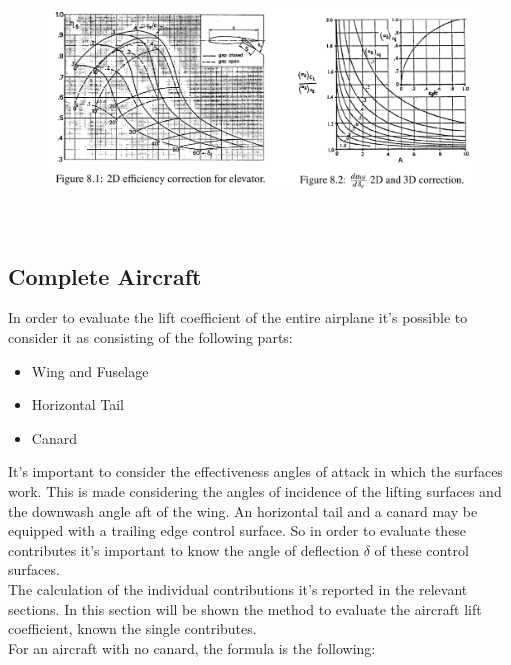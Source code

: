 \begin{figure}[H]
\centering
{\includegraphics[height=6.79cm]{Immagini/alfadeltanew.png}} 
\label{efficiency}
\end{figure} 		


		




\subsection{Complete Aircraft}

In order to evaluate the lift coefficient of the entire airplane it's possible to consider it as consisting of the following parts\cite{ roskam2002airplane}:

\begin{itemize}
\item Wing and Fuselage
\item Horizontal Tail
\item Canard
\end{itemize}

It's important to consider the effectiveness angles of attack in which the surfaces work. This is made considering the angles of incidence of the lifting surfaces and the downwash angle aft of the wing. An horizontal tail and a canard may be equipped with a trailing edge control surface. So in order to evaluate these contributes it's important to know the angle of deflection $\delta$ of these control surfaces.\\
The calculation of the individual contributions it's reported in the relevant sections. In this section will be shown the method to evaluate the aircraft lift coefficient, known the single contributes.\\
For an aircraft with no canard, the formula is the following:

